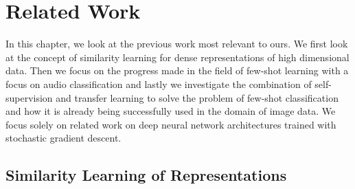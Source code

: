
\chapter{Related Work}\label{chapter:relatedWork}

In this chapter, we look at the previous work most relevant to ours. We first look at the concept of similarity learning for dense representations of high dimensional data. Then we focus on the progress made in the field of few-shot learning with a focus on audio classification and lastly we investigate the combination of self-supervision and transfer learning to solve the problem of few-shot classification and how it is already being successfully used in the domain of image data. We focus solely on related work on deep neural network architectures trained with stochastic gradient descent.

\section{Similarity Learning of Representations}

